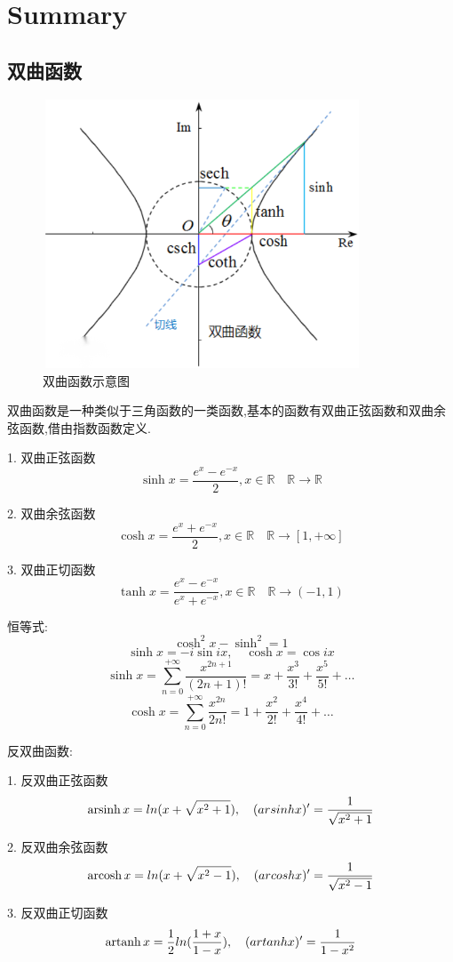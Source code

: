 \chapter{Summary}


\section{双曲函数}

\begin{figure}[htbp]
	\centering
	\includegraphics[width=9.5cm,height=8cm]{"figure/Summary/双曲函数.png"}
	\caption{双曲函数示意图}
	\label{Figure: 双曲函数示意图}
\end{figure} 
\begin{definition}\label{def: 双曲函数}
	双曲函数是一种类似于三角函数的一类函数,基本的函数有双曲正弦函数和双曲余弦函数,借由指数函数定义.
	
	1. 双曲正弦函数 
	$$\sinh x=\frac{e^{x}-e^{-x}}{2},x\in \mathbb{R}\quad \mathbb{R}\rightarrow \mathbb{R}$$
	
	2. 双曲余弦函数
	$$\cosh x=\frac{e^{x}+e^{-x}}{2},x\in \mathbb{R}\quad \mathbb{R}\rightarrow [1,+\infty]$$
	
	3. 双曲正切函数
	$$\tanh x=\frac{e^{x}-e^{-x}}{e^{x}+e^{-x}},x\in \mathbb{R}\quad \mathbb{R}\rightarrow (-1,1)$$
	
	恒等式:  
	$$\cosh^2 x-\sinh^2=1$$
	$$\sinh x=-i\sin ix,\quad \cosh x=\cos ix$$
	$$\sinh x=\sum\limits_{n=0}^{+\infty}\frac{x^{2n+1}}{(2n+1)!}=x+\frac{x^3}{3!}+\frac{x^5}{5!}+\dots$$
	$$\cosh x=\sum\limits_{n=0}^{+\infty}\frac{x^{2n}}{2n!}=1+\frac{x^2}{2!}+\frac{x^4}{4!}+\dots$$
\end{definition}
\begin{definition}
	反双曲函数:  
	
	1. 反双曲正弦函数
	$$\operatorname{arsinh} x=ln(x+\sqrt{x^2+1}),\quad (arsinh x)'=\frac{1}{\sqrt{x^2+1}}$$
	
	2. 反双曲余弦函数
	$$\operatorname{arcosh} x=ln(x+\sqrt{x^2-1}),\quad (arcosh x)'=\frac{1}{\sqrt{x^2-1}}$$
	
	3. 反双曲正切函数
	$$\operatorname{artanh} x=\frac{1}{2}ln(\frac{1+x}{1-x}),\quad (artanh x)'=\frac{1}{1-x^2}$$
\end{definition}


